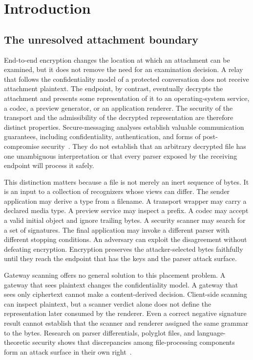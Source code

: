 \section{Introduction}
\label{sec:introduction}

\subsection{The unresolved attachment boundary}

End-to-end encryption changes the location at which an attachment can be
examined, but it does not remove the need for an examination decision. A relay
that follows the confidentiality model of a protected conversation does not
receive attachment plaintext. The endpoint, by contrast, eventually decrypts
the attachment and presents some representation of it to an operating-system
service, a codec, a preview generator, or an application renderer. The security
of the transport and the admissibility of the decrypted representation are
therefore distinct properties. Secure-messaging analyses establish valuable
communication guarantees, including confidentiality, authentication, and
forms of post-compromise security~\cite{unger2015,cohngordon2020}. They do not
establish that an arbitrary decrypted file has one unambiguous interpretation
or that every parser exposed by the receiving endpoint will process it safely.

This distinction matters because a file is not merely an inert sequence of
bytes. It is an input to a collection of recognizers whose views can differ.
The sender application may derive a type from a filename. A transport wrapper
may carry a declared media type. A preview service may inspect a prefix. A
codec may accept a valid initial object and ignore trailing bytes. A security
scanner may search for a set of signatures. The final application may invoke a
different parser with different stopping conditions. An adversary can exploit
the disagreement without defeating encryption. Encryption preserves the
attacker-selected bytes faithfully until they reach the endpoint that has the
keys and the parser attack surface.

Gateway scanning offers no general solution to this placement problem. A
gateway that sees plaintext changes the confidentiality model. A gateway that
sees only ciphertext cannot make a content-derived decision. Client-side
scanning can inspect plaintext, but a scanner verdict alone does not define the
representation later consumed by the renderer. Even a correct negative
signature result cannot establish that the scanner and renderer assigned the
same grammar to the bytes. Research on parser differentials, polyglot files,
and language-theoretic security shows that discrepancies among file-processing
components form an attack surface in their own right~\cite{jana2012,momot2016,
nail2014,everparse2019,ipg2023,koch2025,you2025}.

